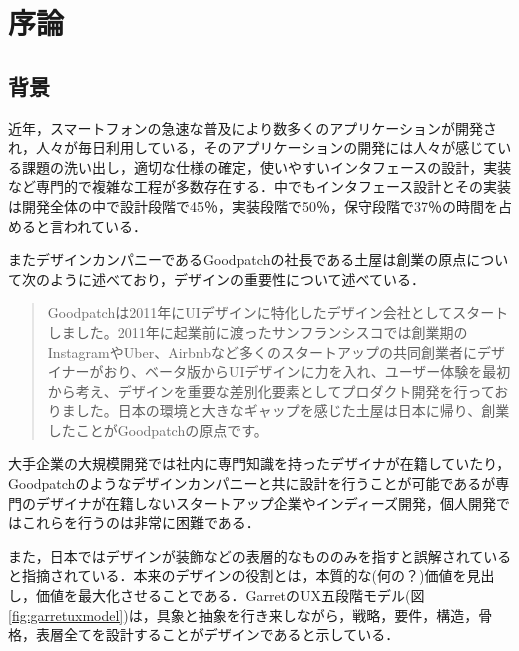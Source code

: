 \chapter{序論}
\label{chap:introduction}

\section{背景}

近年，スマートフォンの急速な普及により数多くのアプリケーションが開発され，人々が毎日利用している，そのアプリケーションの開発には人々が感じている課題の洗い出し，適切な仕様の確定，使いやすいインタフェースの設計，実装など専門的で複雑な工程が多数存在する．中でもインタフェース設計とその実装は開発全体の中で設計段階で45％，実装段階で50％，保守段階で37％の時間を占めると言われている\cite{myers1992survey}．

またデザインカンパニーであるGoodpatchの社長である土屋は創業の原点について次のように述べており，デザインの重要性について述べている．

\begin{quotation}
Goodpatchは2011年にUIデザインに特化したデザイン会社としてスタートしました。2011年に起業前に渡ったサンフランシスコでは創業期のInstagramやUber、Airbnbなど多くのスタートアップの共同創業者にデザイナーがおり、ベータ版からUIデザインに力を入れ、ユーザー体験を最初から考え、デザインを重要な差別化要素としてプロダクト開発を行っておりました。日本の環境と大きなギャップを感じた土屋は日本に帰り、創業したことがGoodpatchの原点です。\cite{goodpatchwhydesign}
\end{quotation}

大手企業の大規模開発では社内に専門知識を持ったデザイナが在籍していたり，Goodpatchのようなデザインカンパニーと共に設計を行うことが可能であるが専門のデザイナが在籍しないスタートアップ企業やインディーズ開発，個人開発ではこれらを行うのは非常に困難である．

また，日本ではデザインが装飾などの表層的なもののみを指すと誤解されていると指摘されている\cite{goodpatchwhydesign}．本来のデザインの役割とは，本質的な(何の？)価値を見出し，価値を最大化させることである．GarretのUX五段階モデル(図\ref{fig:garretuxmodel})は，具象と抽象を行き来しながら，戦略，要件，構造，骨格，表層全てを設計することがデザインであると示している．

